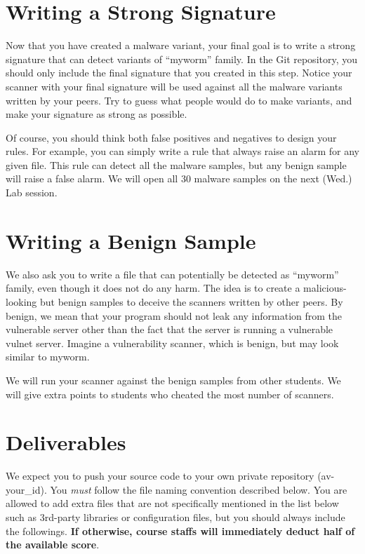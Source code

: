\documentclass[a4paper, 11pt]{article}
\theoremstyle{definition}
\begin{document}
{\section{Writing a Strong Signature}

Now that you have created a malware variant, your final goal is to
write a strong signature that can detect variants of ``myworm''
family. In the Git repository, you should only include the final
signature that you created in this step. Notice your scanner with your
final signature will be used against all the malware variants written
by your peers. Try to guess what people would do to make variants, and
make your signature as strong as possible.

Of course, you should think both false positives and negatives to
design your rules. For example, you can simply write a rule that
always raise an alarm for any given file. This rule can detect all the
malware samples, but any benign sample will raise a false alarm. We
will open all 30 malware samples on the next (Wed.) Lab session.

\section{Writing a Benign Sample}

We also ask you to write a file that can potentially be detected as
``myworm'' family, even though it does not do any harm. The idea is to
create a malicious-looking but benign samples to deceive the scanners
written by other peers. By benign, we mean that your program should
not leak any information from the vulnerable server other than the
fact that the server is running a vulnerable vulnet server. Imagine a
vulnerability scanner, which is benign, but may look similar to
myworm.

We will run your scanner against the benign samples from other
students. We will give extra points to students who cheated the most
number of scanners.

\section{Deliverables}

We expect you to push your source code to your own private repository
(av-your\_id). You \emph{must} follow the file naming convention
described below. You are allowed to add extra files that are not
specifically mentioned in the list below such as 3rd-party libraries
or configuration files, but you should always include the followings.
\textbf{If otherwise, course staffs will immediately deduct half of
the available score}.

}
\end{document}
